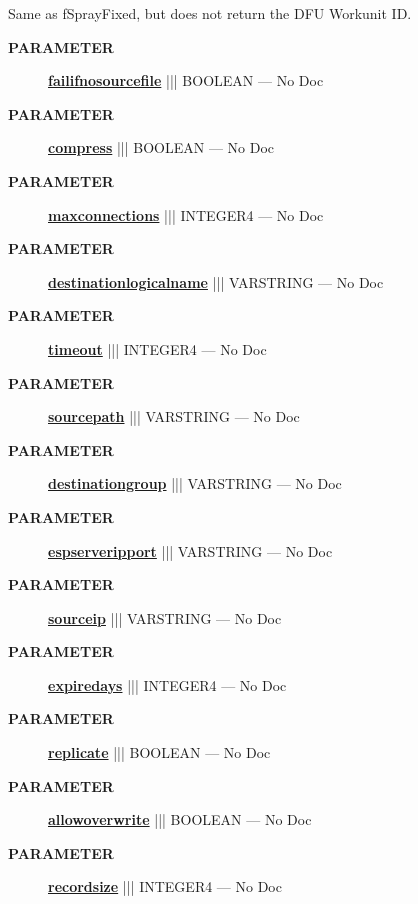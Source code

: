 \par





Same as fSprayFixed, but does not return the DFU Workunit ID.






\par
\begin{description}
\item [\colorbox{tagtype}{\color{white} \textbf{\textsf{PARAMETER}}}] \textbf{\underline{failifnosourcefile}} ||| BOOLEAN --- No Doc
\item [\colorbox{tagtype}{\color{white} \textbf{\textsf{PARAMETER}}}] \textbf{\underline{compress}} ||| BOOLEAN --- No Doc
\item [\colorbox{tagtype}{\color{white} \textbf{\textsf{PARAMETER}}}] \textbf{\underline{maxconnections}} ||| INTEGER4 --- No Doc
\item [\colorbox{tagtype}{\color{white} \textbf{\textsf{PARAMETER}}}] \textbf{\underline{destinationlogicalname}} ||| VARSTRING --- No Doc
\item [\colorbox{tagtype}{\color{white} \textbf{\textsf{PARAMETER}}}] \textbf{\underline{timeout}} ||| INTEGER4 --- No Doc
\item [\colorbox{tagtype}{\color{white} \textbf{\textsf{PARAMETER}}}] \textbf{\underline{sourcepath}} ||| VARSTRING --- No Doc
\item [\colorbox{tagtype}{\color{white} \textbf{\textsf{PARAMETER}}}] \textbf{\underline{destinationgroup}} ||| VARSTRING --- No Doc
\item [\colorbox{tagtype}{\color{white} \textbf{\textsf{PARAMETER}}}] \textbf{\underline{espserveripport}} ||| VARSTRING --- No Doc
\item [\colorbox{tagtype}{\color{white} \textbf{\textsf{PARAMETER}}}] \textbf{\underline{sourceip}} ||| VARSTRING --- No Doc
\item [\colorbox{tagtype}{\color{white} \textbf{\textsf{PARAMETER}}}] \textbf{\underline{expiredays}} ||| INTEGER4 --- No Doc
\item [\colorbox{tagtype}{\color{white} \textbf{\textsf{PARAMETER}}}] \textbf{\underline{replicate}} ||| BOOLEAN --- No Doc
\item [\colorbox{tagtype}{\color{white} \textbf{\textsf{PARAMETER}}}] \textbf{\underline{allowoverwrite}} ||| BOOLEAN --- No Doc
\item [\colorbox{tagtype}{\color{white} \textbf{\textsf{PARAMETER}}}] \textbf{\underline{recordsize}} ||| INTEGER4 --- No Doc
\end{description}







